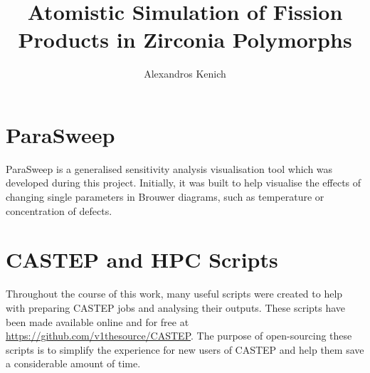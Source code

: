\documentclass[a4paper,12pt,twoside]{report}
\begin{document}
\title{\LARGE {\bf Atomistic Simulation of Fission Products in Zirconia Polymorphs}\\
 \vspace*{6mm}
}

\author{Alexandros Kenich}

\normallinespacing
\maketitle



\preface


%
%

\body

\doublespacing









\label{References}
\renewcommand\bibname{References}



\appendix
\label{Appendix}

\chapter{ParaSweep}

ParaSweep is a generalised sensitivity analysis visualisation tool which was developed during this project. Initially, it was built to help visualise the effects of changing single parameters in Brouwer diagrams, such as temperature or concentration of defects. 


\chapter{CASTEP and HPC Scripts}

Throughout the course of this work, many useful scripts were created to help with preparing CASTEP jobs and analysing their outputs. These scripts have been made available online and for free at \href{https://github.com/v1thesource/CASTEP}{https://github.com/v1thesource/CASTEP}. The purpose of open-sourcing these scripts is to simplify the experience for new users of CASTEP and help them save a considerable amount of time.
\end{document}
